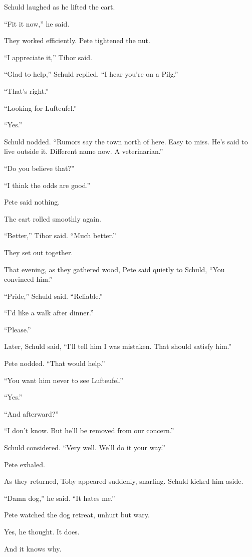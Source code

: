 Schuld laughed as he lifted the cart.

“Fit it now,” he said.

They worked efficiently. Pete tightened the nut.

“I appreciate it,” Tibor said.

“Glad to help,” Schuld replied. “I hear you’re on a Pilg.”

“That’s right.”

“Looking for Lufteufel.”

“Yes.”

Schuld nodded. “Rumors say the town north of here. Easy to miss. He’s said to live outside it. Different name now. A veterinarian.”

“Do you believe that?”

“I think the odds are good.”

Pete said nothing.

The cart rolled smoothly again.

“Better,” Tibor said. “Much better.”

They set out together.

That evening, as they gathered wood, Pete said quietly to Schuld, “You convinced him.”

“Pride,” Schuld said. “Reliable.”

“I’d like a walk after dinner.”

“Please.”

Later, Schuld said, “I’ll tell him I was mistaken. That should satisfy him.”

Pete nodded. “That would help.”

“You want him never to see Lufteufel.”

“Yes.”

“And afterward?”

“I don’t know. But he’ll be removed from our concern.”

Schuld considered. “Very well. We’ll do it your way.”

Pete exhaled.

As they returned, Toby appeared suddenly, snarling. Schuld kicked him aside.

“Damn dog,” he said. “It hates me.”

Pete watched the dog retreat, unhurt but wary.

Yes, he thought. It does.

And it knows why.

